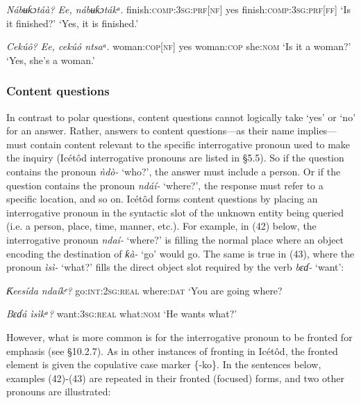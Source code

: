 \begin{table}
\textit{Nábʉƙɔtá}\textit{à}\textit{?      Ee, nábʉƙɔtá}\textit{kᵃ}.
finish:\textsc{comp:3sg:prf}[\textsc{nf}]  yes finish:\textsc{comp:3sg:prf[ff]}
‘Is it finished?’    ‘Yes, it is finished.’




\textit{Cekú}\textit{ô}\textit{?      Ee, cekúó     ntsaᵃ.}
woman:\textsc{cop[nf]}    yes woman:\textsc{cop}   she:\textsc{nom}
‘Is it a woman?’    ‘Yes, she’s a woman.’




\subsubsection{Content questions}

In contrast to polar questions, content questions cannot logically take ‘yes’ or ‘no’ for an answer. Rather, answers to content questions—as their name implies—must contain content relevant to the specific interrogative pronoun used to make the inquiry (Icétôd interrogative pronouns are listed in §5.5). So if the question contains the pronoun \textit{ǹdò- }‘who?’, the answer must include a person. Or if the question contains the pronoun \textit{ndáí- }‘where?’, the response must refer to a specific location, and so on. Icétôd forms content questions by placing an interrogative pronoun in the syntactic slot of the unknown entity being queried (i.e. a person, place, time, manner, etc.). For example, in (42) below, the interrogative pronoun \textit{ndaí-} ‘where?’ is filling the normal place where an object encoding the destination of \textit{ƙà- }‘go’ would go. The same is true in (43), where the pronoun \textit{ìsì- }‘what?’ fills the direct object slot required by the verb \textit{bɛɗ- }‘want’:




\textit{Ƙ}\textit{eesída     ndaíkᵉ?}
go:\textsc{int:2sg:real}   where:\textsc{dat}
‘You are going where?




\textit{Bɛɗá       ìsìkᵃ?}
want:\textsc{3sg:real}   what:\textsc{nom}
‘He wants what?’


However, what is more common is for the interrogative pronoun to be fronted for emphasis (see §10.2.7). As in other instances of fronting in Icétôd, the fronted element is given the copulative case marker \{-ko\}. In the sentences below, examples (42)-(43) are repeated in their fronted (focused) forms, and two other pronouns are illustrated:




\end{table}

